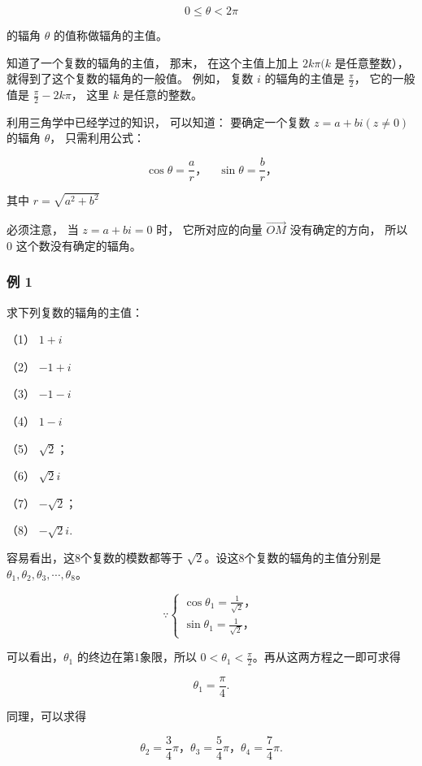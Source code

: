 \[
0 \leqslant \theta < 2 \pi
\]

的辐角 \(\theta\) 的值称做辐角的主值。

知道了一个复数的辐角的主值， 那末， 在这个主值上加上 \(2k\pi (k\)
是任意整数）， 就得到了这个复数的辐角的一般值。 例如， 复数 \(i\)
的辐角的主值是 \(\frac{\pi}{2}\)， 它的一般值是
\(\frac{\pi}{2} - 2k\pi\)， 这里 \(k\) 是任意的整数。

利用三角学中已经学过的知识， 可以知道： 要确定一个复数
\(z = a + bi (z \neq 0)\) 的辐角 \(\theta\)， 只需利用公式：

\[
\cos \theta = \frac {a}{r}\text{，} \quad \sin \theta = \frac {b}{r}\text{，}
\]

其中 \(r = \sqrt{a^2 + b^2}\)

必须注意， 当 \(z = a + bi = 0\) 时， 它所对应的向量
\(\overrightarrow{OM}\) 没有确定的方向， 所以 0 这个数没有确定的辐角。

\subsubsection{例 1}

求下列复数的辐角的主值：

（1） \(1 + i\)

（2） \(-1 + i\)

（3） \(-1 - i\)

（4） \(1 - i\)

（5） \(\sqrt{2}\)；

（6） \(\sqrt{2} i\)

（7） \(-\sqrt{2}\)；

（8） \(-\sqrt{2} i.\)

 容易看出，这8个复数的模数都等于
\(\sqrt{2}\)。设这8个复数的辐角的主值分别是
\(\theta_{1}, \theta_{2}, \theta_{3}, \cdots, \theta_{8}\)。

\[
\because \left\{ \begin{array}{l} \cos \theta_ {1} = \frac {1}{\sqrt {2}}\text{，} \\ \sin \theta_ {1} = \frac {1}{\sqrt {2}}\text{，} \end{array} \right.
\]

可以看出，\(\theta_{1}\) 的终边在第1象限，所以
\(0 < \theta_{1} < \frac{\pi}{2}\)。再从这两方程之一即可求得

\[
\theta_ {1} = \frac {\pi}{4}.
\]

同理，可以求得

\[
\theta_ {2} = \frac {3}{4} \pi \text{，} \theta_ {3} = \frac {5}{4} \pi \text{，} \theta_ {4} = \frac {7}{4} \pi .
\]

